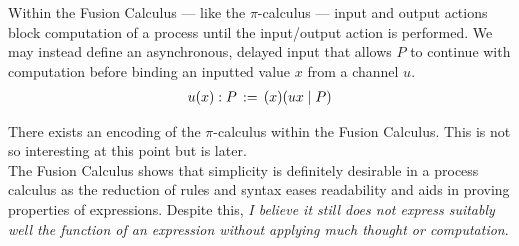     \begin{example*}
        Within the Fusion Calculus --- like the $\pi$-calculus --- input and output actions block computation of a process until the input/output action is performed.
        We may instead define an asynchronous, delayed input that allows $P$ to continue with computation before binding an inputted value $x$ from a channel $u$.
        \begin{align*}
            u(x): P \, := \, (x)(ux \; | \; P)
        \end{align*}
    \end{example*}

    
    \begin{remarks}
        There exists an encoding of the $\pi$-calculus within the Fusion Calculus.
        This is not so interesting at this point but is later. \\
        The Fusion Calculus shows that simplicity is definitely desirable in a process calculus as the reduction of rules and syntax eases readability and aids in proving properties of expressions.
        Despite this, \textit{I believe it still does not express suitably well the function of an expression without applying much thought or computation}.
    \end{remarks}
